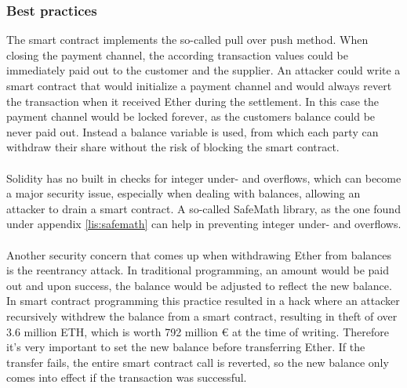 \subsubsection{Best practices}
The smart contract implements the so-called pull over push method\cite{best-practice}.
When closing the payment channel, the according transaction values could be immediately paid out to the customer and the supplier.
An attacker could write a smart contract that would initialize a payment channel and would always revert the transaction when it received Ether during the settlement.
In this case the payment channel would be locked forever, as the customers balance could be never paid out.
Instead a balance variable is used, from which each party can withdraw their share without the risk of blocking the smart contract.
\\\\
Solidity has no built in checks for integer under- and overflows, which can become a major security issue, especially when dealing with balances, allowing an attacker to drain a smart contract.
A so-called SafeMath library, as the one found under appendix \ref{lis:safemath} can help in preventing integer under- and overflows.
\\\\
Another security concern that comes up when withdrawing Ether from balances is the reentrancy attack.
In traditional programming, an amount would be paid out and upon success, the balance would be adjusted to reflect the new balance.
In smart contract programming this practice resulted in a hack where an attacker recursively withdrew the balance from a smart contract, resulting in theft of over 3.6 million ETH, which is worth 792 million \euro{} at the time of writing\cite{dao-hack}.
Therefore it's very important to set the new balance before transferring Ether.
If the transfer fails, the entire smart contract call is reverted, so the new balance only comes into effect if the transaction was successful.